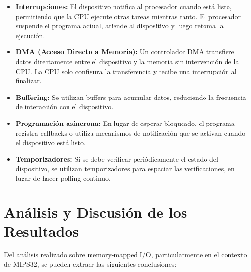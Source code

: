 \documentclass[12pt]{article}
\begin{document}
	\begin{itemize}
		\item \textbf{Interrupciones:} El dispositivo notifica al procesador cuando está listo, permitiendo que la CPU ejecute otras tareas mientras tanto. El procesador suspende el programa actual, atiende al dispositivo y luego retoma la ejecución.
		
		\item \textbf{DMA (Acceso Directo a Memoria):} Un controlador DMA transfiere datos directamente entre el dispositivo y la memoria sin intervención de la CPU. La CPU solo configura la transferencia y recibe una interrupción al finalizar.
		
		\item \textbf{Buffering:} Se utilizan buffers para acumular datos, reduciendo la frecuencia de interacción con el dispositivo.
		
		\item \textbf{Programación asíncrona:} En lugar de esperar bloqueado, el programa registra callbacks o utiliza mecanismos de notificación que se activan cuando el dispositivo está listo.
		
		\item \textbf{Temporizadores:} Si se debe verificar periódicamente el estado del dispositivo, se utilizan temporizadores para espaciar las verificaciones, en lugar de hacer polling continuo.
	\end{itemize}
	
	\section{Análisis y Discusión de los Resultados}
	
	Del análisis realizado sobre memory-mapped I/O, particularmente en el contexto de MIPS32, se pueden extraer las siguientes conclusiones:
	
\end{document}
